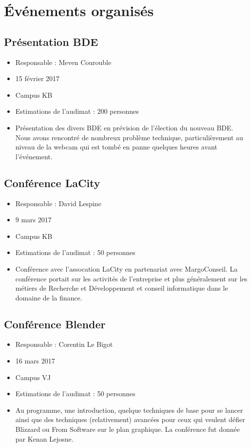 \documentclass[12pt,a4paper]{article}
\begin{document}
\section{Événements organisés}

\subsection{Présentation BDE}
\begin{itemize}
\item Responsable : Meven Courouble
\item 15 février 2017
\item Campus KB
\item Estimations de l'audimat : 200 personnes
\item Présentation des divers BDE en prévision de l'élection du nouveau BDE. Nous avons rencontré de nombreux problème technique, particulièrement au niveau de la webcam qui est tombé en panne quelques heures avant l'événement.
\end{itemize}

\subsection{Conférence LaCity}
\begin{itemize}
\item Responsable : David Lespine
\item 9 mars 2017
\item Campus KB
\item Estimations de l'audimat : 50 personnes
\item Conférence avec l'assocation LaCity en partenariat avec MargoConseil. La conférence portait sur les activités de l'entreprise et plus généralement sur les métiers de Recherche et Développement et conseil informatique dans le domaine de la finance.
\end{itemize}

\subsection{Conférence Blender}
\begin{itemize}
\item Responsable : Corentin Le Bigot
\item 16 mars 2017
\item Campus VJ
\item Estimations de l'audimat : 50 personnes
\item Au programme, une introduction, quelque techniques de base pour se lancer ainsi que des techniques (relativement) avancées pour ceux qui veulent défier Blizzard ou From Software sur le plan graphique. La conférence fut donnée par Kenan Lejosne.
\end{itemize}
\end{document}
